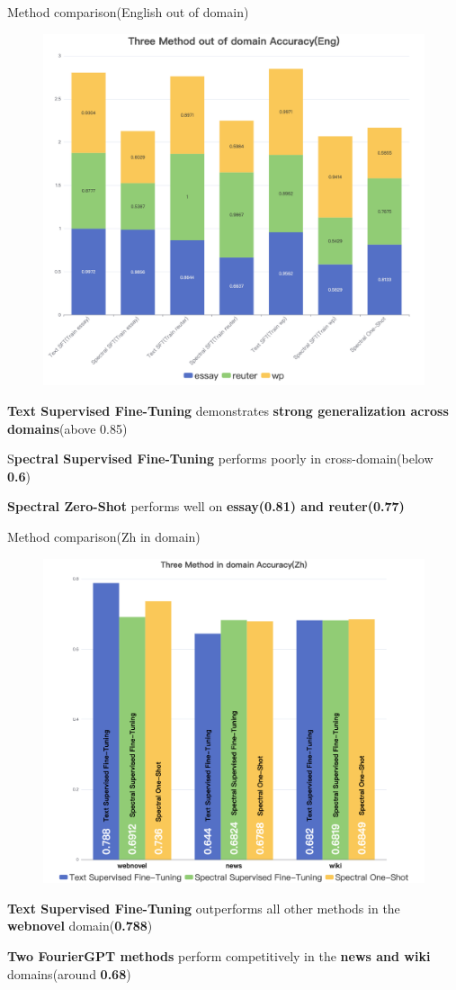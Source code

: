 \documentclass[serif]{beamer}
\begin{document}
\begin{frame}{Method comparison(English out of domain)}
\begin{figure}
    \centering
    \includegraphics[width=0.4\linewidth]{images/Three Method out of domain Accuracy(Eng).png}
\end{figure}

\vspace{-0.5em}
\small{
\begin{item}
     \item \textbf{Text Supervised Fine-Tuning} demonstrates \textbf{strong generalization across domains}(above 0.85)

    \item S\textbf{pectral Supervised Fine-Tuning} performs poorly in cross-domain(below \textbf{0.6})

    \item \textbf{Spectral Zero-Shot} performs well on \textbf{essay(0.81) and reuter(0.77)}
\end{item}
}
\end{frame}

\begin{frame}{Method comparison(Zh in domain)}
\begin{figure}
    \centering
    \includegraphics[width=0.5\linewidth]{images/Three Method in domain Accuracy(Zh).png}
\end{figure}
\vspace{-0.5em}
\small{
\begin{item}
     \item \textbf{Text Supervised Fine-Tuning} outperforms all other methods in the \textbf{webnovel} domain(\textbf{0.788})

    \item \textbf{Two FourierGPT methods} perform competitively in the \textbf{news and wiki} domains(around \textbf{0.68})
\end{item}
}
\end{frame}
\end{document}
